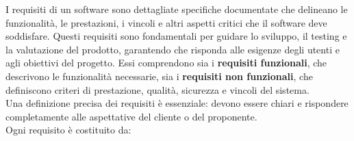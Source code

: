 \newpage
{}
I requisiti di un software sono dettagliate specifiche documentate che delineano le funzionalità, le prestazioni, i vincoli e altri aspetti critici che il software deve soddisfare. Questi requisiti sono fondamentali per guidare lo sviluppo, il testing e la valutazione del prodotto, garantendo che risponda alle esigenze degli utenti e agli obiettivi del progetto. Essi comprendono sia i \textbf{requisiti funzionali}, che descrivono le funzionalità necessarie, sia i \textbf{requisiti non funzionali}, che definiscono criteri di prestazione, qualità, sicurezza e vincoli del sistema.\\
Una definizione precisa dei requisiti è essenziale: devono essere chiari e rispondere completamente alle aspettative del cliente o del proponente.\\
Ogni requisito è costituito da:
